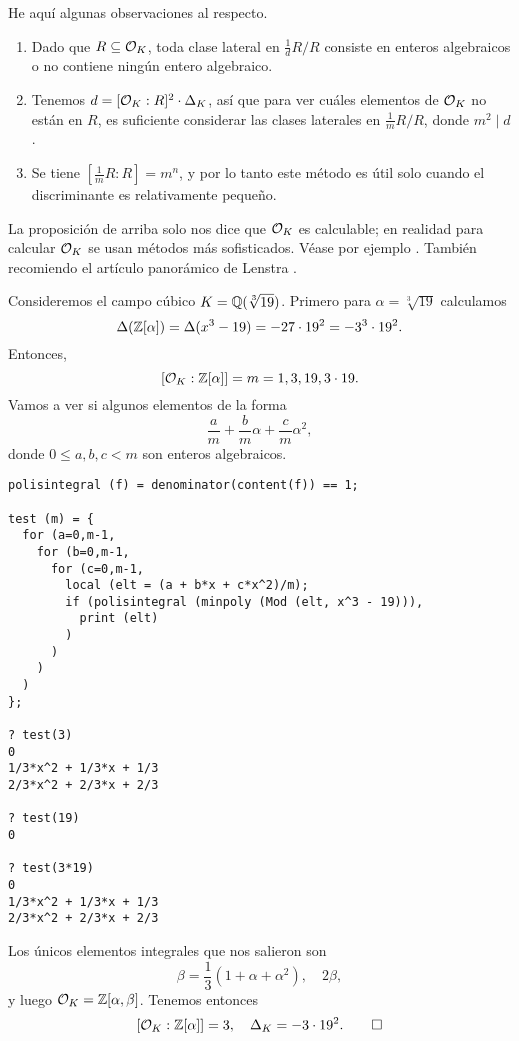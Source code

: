 \begin{comentario}
  He aquí algunas observaciones al respecto.

  \begin{enumerate}
  \item Dado que $R \subseteq \mathcal{O}_K$, toda clase lateral en $\frac{1}{d}R/R$
    consiste en enteros algebraicos o no contiene ningún entero algebraico.

  \item Tenemos $d = [\mathcal{O}_K : R]^2\cdot \Delta_K$, así que para ver cuáles
    elementos de $\mathcal{O}_K$ no están en $R$, es suficiente considerar las clases
    laterales en $\frac{1}{m}R/R$, donde $m^2 \mid d$.

  \item Se tiene $[\frac{1}{m}R : R] = m^n$, y por lo tanto este método es útil
    solo cuando el discriminante es relativamente pequeño.
  \end{enumerate}

  La proposición de arriba solo nos dice que $\mathcal{O}_K$ es calculable; en realidad
  para calcular $\mathcal{O}_K$ se usan métodos más sofisticados. Véase por ejemplo
  \cite[\S 6.1]{Cohen-GTM138}. También recomiendo el artículo panorámico
  de Lenstra \cite{Lenstra-1992}.
\end{comentario}

\begin{ejemplo}
  \label{ejemplo:raiz-cubica-de-19}
  Consideremos el campo cúbico $K = \mathbb{Q} (\sqrt[3]{19})$. Primero para
  $\alpha = \sqrt[3]{19}$ calculamos
  \[ \Delta (\mathbb{Z} [\alpha]) = \Delta (x^3 - 19)
     = -27\cdot 19^2 = -3^3\cdot 19^2. \]
  Entonces,
  $$[\mathcal{O}_K : \mathbb{Z} [\alpha]] = m = 1, 3, 19, 3\cdot 19.$$
  Vamos a ver si algunos elementos de la forma
  $$\frac{a}{m} + \frac{b}{m}\alpha + \frac{c}{m}\alpha^2,$$
  donde $0 \le a,b,c < m$ son enteros algebraicos.

\begin{shaded}
\begin{verbatim}
polisintegral (f) = denominator(content(f)) == 1;

test (m) = {
  for (a=0,m-1,
    for (b=0,m-1,
      for (c=0,m-1,
        local (elt = (a + b*x + c*x^2)/m);
        if (polisintegral (minpoly (Mod (elt, x^3 - 19))),
          print (elt)
        )
      )
    )
  )
};

? test(3)
0
1/3*x^2 + 1/3*x + 1/3
2/3*x^2 + 2/3*x + 2/3

? test(19)
0

? test(3*19)
0
1/3*x^2 + 1/3*x + 1/3
2/3*x^2 + 2/3*x + 2/3
\end{verbatim}
\end{shaded}
  Los únicos elementos integrales que nos salieron son
  $$\beta = \frac{1}{3} (1 + \alpha + \alpha^2), \quad 2\beta,$$
  y luego $\mathcal{O}_K = \mathbb{Z} [\alpha,\beta]$. Tenemos entonces
  \[ [\mathcal{O}_K : \mathbb{Z} [\alpha]] = 3, \quad \Delta_K = -3\cdot 19^2. \qedhere \]
\end{ejemplo}

